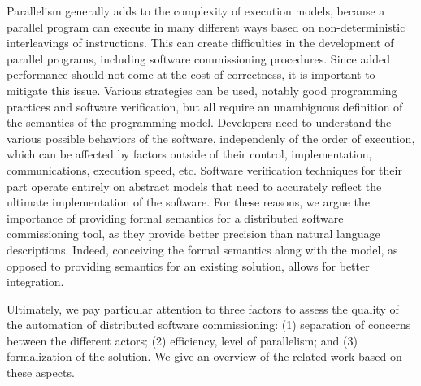 Parallelism generally adds to the complexity of execution models,
because a parallel program can execute in many different ways based on
non-deterministic interleavings of instructions. This can create
difficulties in the development of parallel programs, including
software commissioning procedures. Since added performance should not
come at the cost of correctness, it is important to mitigate this
issue. Various strategies can be used, notably good programming
practices and software verification, but all require an unambiguous
definition of the semantics of the programming model. Developers need
to understand the various possible behaviors of the software,
independenly of the order of execution, which can be affected by
factors outside of their control, \eg implementation, communications,
execution speed, etc. Software verification techniques for their part
operate entirely on abstract models that need to accurately reflect
the ultimate implementation of the software. For these reasons, we
argue the importance of providing formal semantics for a distributed
software commissioning tool, as they provide better precision than
natural language descriptions. Indeed, conceiving the formal semantics
along with the model, as opposed to providing semantics for an
existing solution, allows for better integration.

Ultimately, we pay particular attention to three factors to
assess the quality of the automation of distributed software
commissioning: (1) separation of concerns between the different
actors; (2) efficiency, \ie level of parallelism; and (3)
formalization of the solution. We give an overview of the related work
based on these aspects.
